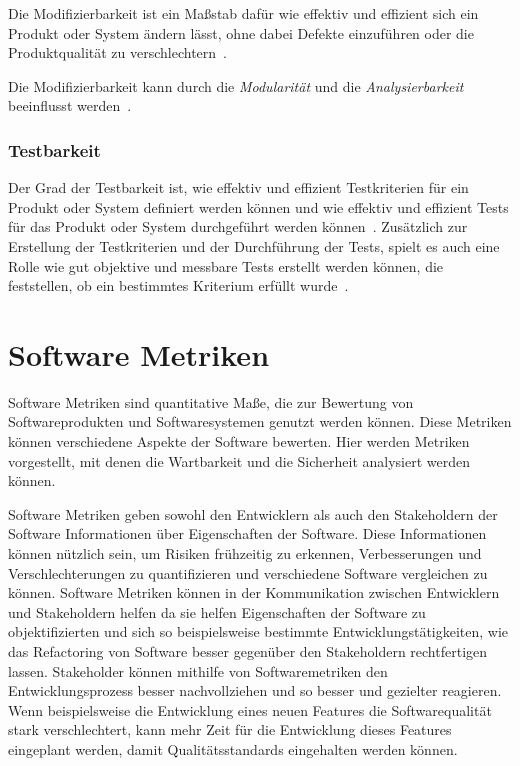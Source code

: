 \documentclass[12pt, a4paper, ngerman]{article}
\begin{document}
Die Modifizierbarkeit ist ein Maßstab dafür wie effektiv und effizient sich ein Produkt oder System
ändern lässt, ohne dabei Defekte einzuführen oder die Produktqualität zu verschlechtern~\cite{ISO25010}.

Die Modifizierbarkeit kann durch die \emph{Modularität} und die \emph{Analysierbarkeit} beeinflusst werden~\cite{ISO25010}.

\subsubsection{Testbarkeit}

Der Grad der Testbarkeit ist,
wie effektiv und effizient Testkriterien für ein Produkt oder System definiert werden können
und wie effektiv und effizient Tests für das Produkt oder System durchgeführt werden können~\cite{ISO25010}.
Zusätzlich zur Erstellung der Testkriterien und der Durchführung der Tests,
spielt es auch eine Rolle wie gut objektive und messbare Tests erstellt werden können,
die feststellen, ob ein bestimmtes Kriterium erfüllt wurde~\cite{IEEE24765}.

\section{Software Metriken}

Software Metriken sind quantitative Maße,
die zur Bewertung von Softwareprodukten und Softwaresystemen
genutzt werden können.
Diese Metriken können verschiedene Aspekte der Software bewerten.
Hier werden Metriken vorgestellt,
mit denen die Wartbarkeit und die Sicherheit
analysiert werden können.

Software Metriken geben sowohl den Entwicklern
als auch den Stakeholdern der Software
Informationen über Eigenschaften der Software.
Diese Informationen können nützlich sein,
um Risiken frühzeitig zu erkennen,
Verbesserungen und Verschlechterungen zu quantifizieren
und verschiedene Software vergleichen zu können.
Software Metriken können in der Kommunikation
zwischen Entwicklern und Stakeholdern helfen
da sie helfen Eigenschaften der Software zu objektifizierten
und sich so beispielsweise bestimmte Entwicklungstätigkeiten,
wie das Refactoring von Software
besser gegenüber den Stakeholdern rechtfertigen lassen.
Stakeholder können mithilfe von Softwaremetriken
den Entwicklungsprozess besser nachvollziehen
und so besser und gezielter reagieren.
Wenn beispielsweise die Entwicklung eines neuen Features
die Softwarequalität stark verschlechtert,
kann mehr Zeit für die Entwicklung dieses Features
eingeplant werden, damit Qualitätsstandards eingehalten werden können.
\end{document}
